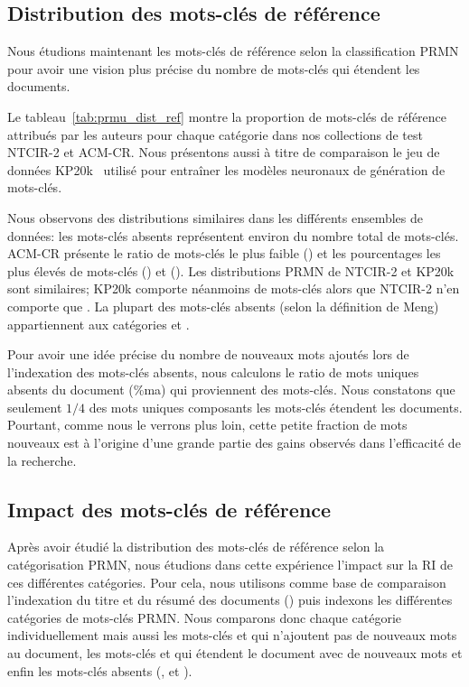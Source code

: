 \subsection{Distribution des mots-clés de référence}
\label{sec:dist}

Nous étudions maintenant les mots-clés de référence selon la classification PRMN pour avoir une vision plus précise du nombre de mots-clés qui étendent les documents.



Le tableau~\ref{tab:prmu_dist_ref} montre la proportion de mots-clés de référence attribués par les auteurs pour chaque catégorie dans nos collections de test NTCIR-2 et ACM-CR.
Nous présentons aussi à titre de comparaison le jeu de données KP20k~\cite{meng_deep_2017} utilisé pour entraîner les modèles neuronaux de génération de mots-clés.

Nous observons des distributions similaires dans les différents ensembles de données: les mots-clés absents représentent environ  du nombre total de mots-clés.
ACM-CR présente le ratio de mots-clés \present{} le plus faible () et les pourcentages les plus élevés de mots-clés \reordonnes{} () et \mixtes{} ().
Les distributions PRMN de NTCIR-2 et KP20k sont similaires; KP20k comporte néanmoins  de mots-clés \nonvu{} alors que NTCIR-2 n'en comporte que .
La plupart des mots-clés absents (selon la définition de Meng) appartiennent aux catégories \mixtes{} et \nonvus{}.

Pour avoir une idée précise du nombre de nouveaux mots ajoutés lors de l'indexation des mots-clés absents, nous calculons le ratio de mots uniques absents du document (\%ma) qui proviennent des mots-clés. %
Nous constatons que seulement $1/4$ des mots uniques composants les mots-clés étendent les documents.
Pourtant, comme nous le verrons plus loin, cette petite fraction de mots nouveaux est à l'origine d'une grande partie des gains observés dans l'efficacité de la recherche.



\subsection{Impact des mots-clés de référence}
\label{sec:ir}

Après avoir étudié la distribution des mots-clés de référence selon la catégorisation PRMN, nous étudions dans cette expérience l'impact sur la RI de ces différentes catégories.
Pour cela, nous utilisons comme base de comparaison l'indexation du titre et du résumé des documents (\trc{}) puis indexons les différentes catégories de mots-clés PRMN.
Nous comparons donc chaque catégorie individuellement mais aussi les mots-clés \presents{} et \reordonnes{} qui n'ajoutent pas de nouveaux mots au document, les mots-clés \mixtes{} et \nonvus{} qui étendent le document avec de nouveaux mots et enfin les mots-clés absents (\reordonnes{}, \mixtes{} et \nonvus).

